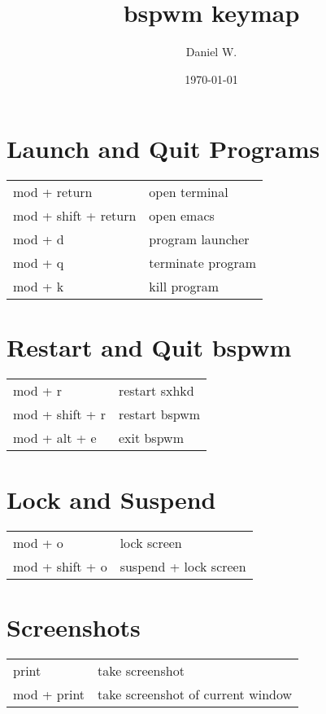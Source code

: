 \documentclass[
    a4paper,
    10pt,
    notitlepage,
    egregdoesnotlikesansseriftitles
]{scrartcl}
\title{bspwm keymap}
\author{Daniel W.}
\date{\today}
\begin{document}
\maketitle

\section{Launch and Quit Programs}
\begin{tabular}{p{4cm}l}
    mod + return            & open terminal                         \\
    mod + shift + return    & open emacs                            \\
    mod + d                 & program launcher                      \\
    mod + q                 & terminate program                     \\
    mod + k                 & kill program
\end{tabular}

\section{Restart and Quit bspwm}
\begin{tabular}{p{4cm}l}
    mod + r             & restart sxhkd                         \\
    mod + shift + r     & restart bspwm                         \\
    mod + alt + e       & exit bspwm
\end{tabular}

\section{Lock and Suspend}
\begin{tabular}{p{4cm}l}
    mod + o             & lock screen                           \\
    mod + shift + o     & suspend + lock screen
\end{tabular}

\section{Screenshots}
\begin{tabular}{p{4cm}l}
    print               & take screenshot                       \\
    mod + print         & take screenshot of current window
\end{tabular}
\end{document}
